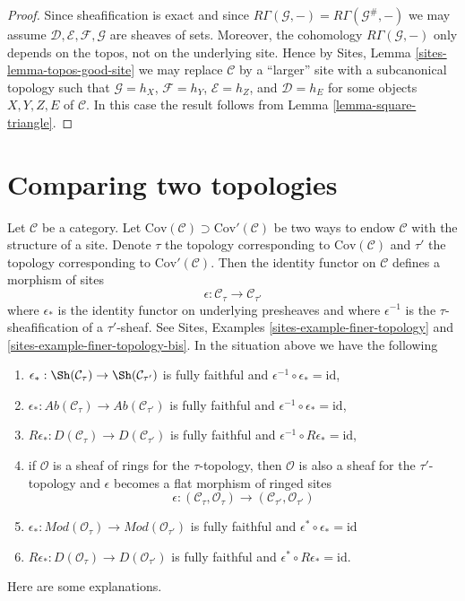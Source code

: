 \begin{proof}
Since sheafification is exact and since
$R\Gamma(\mathcal{G}, -) = R\Gamma(\mathcal{G}^\#, -)$
we may assume $\mathcal{D}, \mathcal{E}, \mathcal{F}, \mathcal{G}$
are sheaves of sets. Moreover, the cohomology
$R\Gamma(\mathcal{G}, -)$ only depends on the topos,
not on the underlying site. Hence by
Sites, Lemma \ref{sites-lemma-topos-good-site}
we may replace $\mathcal{C}$ by a ``larger'' site
with a subcanonical topology such that $\mathcal{G} = h_X$,
$\mathcal{F} = h_Y$,
$\mathcal{E} = h_Z$, and
$\mathcal{D} = h_E$
for some objects $X, Y, Z, E$ of $\mathcal{C}$.
In this case the result follows from
Lemma \ref{lemma-square-triangle}.
\end{proof}







\section{Comparing two topologies}
\label{section-compare}

\noindent
Let $\mathcal{C}$ be a category. Let
$\text{Cov}(\mathcal{C}) \supset \text{Cov}'(\mathcal{C})$
be two ways to endow $\mathcal{C}$ with the structure of a site.
Denote $\tau$ the topology corresponding to $\text{Cov}(\mathcal{C})$
and $\tau'$ the topology corresponding to $\text{Cov}'(\mathcal{C})$.
Then the identity functor on $\mathcal{C}$ defines a morphism
of sites
$$
\epsilon : \mathcal{C}_\tau \longrightarrow \mathcal{C}_{\tau'}
$$
where $\epsilon_*$ is the identity functor on underlying presheaves and
where $\epsilon^{-1}$ is the $\tau$-sheafification of a $\tau'$-sheaf.
See Sites, Examples \ref{sites-example-finer-topology} and
\ref{sites-example-finer-topology-bis}.
In the situation above we have the following
\begin{enumerate}
\item $\epsilon_* : \Sh(\mathcal{C}_\tau) \to \Sh(\mathcal{C}_{\tau'})$
is fully faithful and $\epsilon^{-1} \circ \epsilon_* = \text{id}$,
\item $\epsilon_* : \textit{Ab}(\mathcal{C}_\tau) \to
\textit{Ab}(\mathcal{C}_{\tau'})$
is fully faithful and $\epsilon^{-1} \circ \epsilon_* = \text{id}$,
\item $R\epsilon_* : D(\mathcal{C}_\tau) \to D(\mathcal{C}_{\tau'})$
is fully faithful and $\epsilon^{-1} \circ R\epsilon_* = \text{id}$,
\item if $\mathcal{O}$ is a sheaf of rings for the $\tau$-topology,
then $\mathcal{O}$ is also a sheaf for the $\tau'$-topology
and $\epsilon$ becomes a flat morphism of ringed sites
$$
\epsilon :
(\mathcal{C}_\tau, \mathcal{O}_\tau)
\longrightarrow
(\mathcal{C}_{\tau'}, \mathcal{O}_{\tau'})
$$
\item $\epsilon_* : \textit{Mod}(\mathcal{O}_\tau) \to
\textit{Mod}(\mathcal{O}_{\tau'})$ is
fully faithful and $\epsilon^* \circ \epsilon_* = \text{id}$
\item $R\epsilon_* : D(\mathcal{O}_\tau) \to D(\mathcal{O}_{\tau'})$
is fully faithful and $\epsilon^* \circ R\epsilon_* = \text{id}$.
\end{enumerate}
Here are some explanations.

